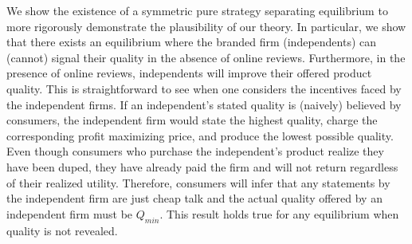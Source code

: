 \documentclass[mksc,blindrev]{informs3} %
\begin{document}
We show the existence of a symmetric pure strategy separating equilibrium to more rigorously demonstrate the plausibility of our theory. In particular, we show that there exists an equilibrium where the branded firm (independents) can (cannot) signal their quality in the absence of online reviews. Furthermore, in the presence of online reviews, independents will improve their offered product quality. This is straightforward  to see when one considers the incentives faced by the independent firms. If an independent's stated quality is (naively) believed by consumers, the independent firm would state the highest quality, charge the corresponding profit maximizing price, and produce the lowest possible quality. Even though consumers who purchase the independent's product realize they have been duped, they have already paid the firm and will not return regardless of their realized utility. Therefore, consumers will infer that any statements by the  independent firm are just cheap talk and the actual quality offered by an independent firm must be $Q_{min}$. This result holds true for any equilibrium when quality is not revealed.

\end{document}
